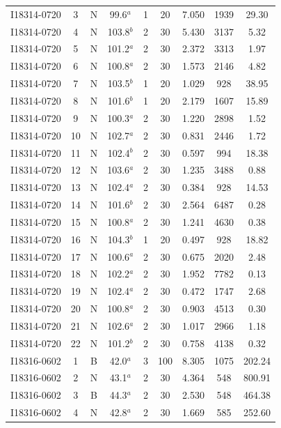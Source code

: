 \begin{table}
\begin{tabular}{ccccccccc}
I18314-0720 & 3 & N & 99.6$^{a}$ & 1 & 20 & 7.050 & 1939 & 29.30 \\
I18314-0720 & 4 & N & 103.8$^{b}$ & 2 & 30 & 5.430 & 3137 & 5.32 \\
I18314-0720 & 5 & N & 101.2$^{a}$ & 2 & 30 & 2.372 & 3313 & 1.97 \\
I18314-0720 & 6 & N & 100.8$^{a}$ & 2 & 30 & 1.573 & 2146 & 4.82 \\
I18314-0720 & 7 & N & 103.5$^{b}$ & 1 & 20 & 1.029 & 928 & 38.95 \\
I18314-0720 & 8 & N & 101.6$^{b}$ & 1 & 20 & 2.179 & 1607 & 15.89 \\
I18314-0720 & 9 & N & 100.3$^{a}$ & 2 & 30 & 1.220 & 2898 & 1.52 \\
I18314-0720 & 10 & N & 102.7$^{a}$ & 2 & 30 & 0.831 & 2446 & 1.72 \\
I18314-0720 & 11 & N & 102.4$^{b}$ & 2 & 30 & 0.597 & 994 & 18.38 \\
I18314-0720 & 12 & N & 103.6$^{a}$ & 2 & 30 & 1.235 & 3488 & 0.88 \\
I18314-0720 & 13 & N & 102.4$^{a}$ & 2 & 30 & 0.384 & 928 & 14.53 \\
I18314-0720 & 14 & N & 101.6$^{b}$ & 2 & 30 & 2.564 & 6487 & 0.28 \\
I18314-0720 & 15 & N & 100.8$^{a}$ & 2 & 30 & 1.241 & 4630 & 0.38 \\
I18314-0720 & 16 & N & 104.3$^{b}$ & 1 & 20 & 0.497 & 928 & 18.82 \\
I18314-0720 & 17 & N & 100.6$^{a}$ & 2 & 30 & 0.675 & 2020 & 2.48 \\
I18314-0720 & 18 & N & 102.2$^{a}$ & 2 & 30 & 1.952 & 7782 & 0.13 \\
I18314-0720 & 19 & N & 102.4$^{a}$ & 2 & 30 & 0.472 & 1747 & 2.68 \\
I18314-0720 & 20 & N & 100.8$^{a}$ & 2 & 30 & 0.903 & 4513 & 0.30 \\
I18314-0720 & 21 & N & 102.6$^{a}$ & 2 & 30 & 1.017 & 2966 & 1.18 \\
I18314-0720 & 22 & N & 101.2$^{b}$ & 2 & 30 & 0.758 & 4138 & 0.32 \\
I18316-0602 & 1 & B & 42.0$^{a}$ & 3 & 100 & 8.305 & 1075 & 202.24 \\
I18316-0602 & 2 & N & 43.1$^{a}$ & 2 & 30 & 4.364 & 548 & 800.91 \\
I18316-0602 & 3 & B & 44.3$^{a}$ & 2 & 30 & 2.530 & 548 & 464.38 \\
I18316-0602 & 4 & N & 42.8$^{a}$ & 2 & 30 & 1.669 & 585 & 252.60 \\

\end{tabular}
\end{table}
